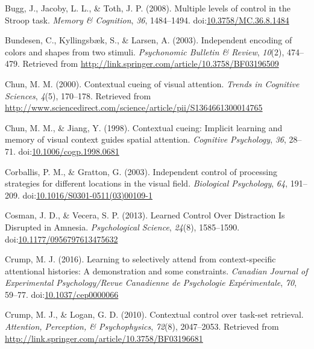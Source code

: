\documentclass[english,,man,floatsintext]{apa6}
\begin{document}
\hypertarget{ref-bugg_multiple_2008}{}
Bugg, J., Jacoby, L. L., \& Toth, J. P. (2008). Multiple levels of
control in the Stroop task. \emph{Memory \& Cognition}, \emph{36},
1484--1494.
doi:\href{https://doi.org/10.3758/MC.36.8.1484}{10.3758/MC.36.8.1484}

\hypertarget{ref-bundesen_independent_2003}{}
Bundesen, C., Kyllingsbæk, S., \& Larsen, A. (2003). Independent
encoding of colors and shapes from two stimuli. \emph{Psychonomic
Bulletin \& Review}, \emph{10}(2), 474--479. Retrieved from
\url{http://link.springer.com/article/10.3758/BF03196509}

\hypertarget{ref-chun_contextual_2000}{}
Chun, M. M. (2000). Contextual cueing of visual attention. \emph{Trends
in Cognitive Sciences}, \emph{4}(5), 170--178. Retrieved from
\url{http://www.sciencedirect.com/science/article/pii/S1364661300014765}

\hypertarget{ref-chun_contextual_1998}{}
Chun, M. M., \& Jiang, Y. (1998). Contextual cueing: Implicit learning
and memory of visual context guides spatial attention. \emph{Cognitive
Psychology}, \emph{36}, 28--71.
doi:\href{https://doi.org/10.1006/cogp.1998.0681}{10.1006/cogp.1998.0681}

\hypertarget{ref-corballis_independent_2003}{}
Corballis, P. M., \& Gratton, G. (2003). Independent control of
processing strategies for different locations in the visual field.
\emph{Biological Psychology}, \emph{64}, 191--209.
doi:\href{https://doi.org/10.1016/S0301-0511(03)00109-1}{10.1016/S0301-0511(03)00109-1}

\hypertarget{ref-cosman_learned_2013}{}
Cosman, J. D., \& Vecera, S. P. (2013). Learned Control Over Distraction
Is Disrupted in Amnesia. \emph{Psychological Science}, \emph{24}(8),
1585--1590.
doi:\href{https://doi.org/10.1177/0956797613475632}{10.1177/0956797613475632}

\hypertarget{ref-crump_learning_2016}{}
Crump, M. J. (2016). Learning to selectively attend from
context-specific attentional histories: A demonstration and some
constraints. \emph{Canadian Journal of Experimental Psychology/Revue
Canadienne de Psychologie Expérimentale}, \emph{70}, 59--77.
doi:\href{https://doi.org/10.1037/cep0000066}{10.1037/cep0000066}

\hypertarget{ref-crump_contextual_2010}{}
Crump, M. J., \& Logan, G. D. (2010). Contextual control over task-set
retrieval. \emph{Attention, Perception, \& Psychophysics}, \emph{72}(8),
2047--2053. Retrieved from
\url{http://link.springer.com/article/10.3758/BF03196681}
\end{document}
